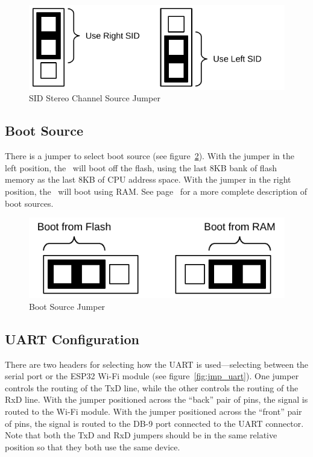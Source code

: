 \begin{figure}[ht]
    \begin{center}
        \includegraphics[scale=0.65]{images/jumper_channel.pdf}
    \end{center}
    \caption{SID Stereo Channel Source Jumper}
    \label{fig:jmp_sid_channel}
\end{figure}

\subsection*{Boot Source}

There is a jumper to select boot source (see figure~\ref{fig:jmp_boot}). With the jumper in the left position, the \fjr\ will boot off the flash, using the last 8KB bank of flash memory as the last 8KB of CPU address space. With the jumper in the right position, the \fjr\ will boot using RAM. See page~\pageref{pg:mmu_boot_config} for a more complete description of boot sources.

\begin{figure}[ht]
    \begin{center}
        \includegraphics[scale=0.65]{images/jumper_boot.pdf}
    \end{center}
    \caption{Boot Source Jumper}
    \label{fig:jmp_boot}
\end{figure}

\subsection*{UART Configuration}

There are two headers for selecting how the UART is used---selecting between the serial port or the ESP32 Wi-Fi module (see figure~\ref{fig:jmp_uart}). One jumper controls the routing of the TxD line, while the other controls the routing of the RxD line. With the jumper positioned across the ``back'' pair of pins, the signal is routed to the Wi-Fi module. With the jumper positioned across the ``front'' pair of pins, the signal is routed to the DB-9 port connected to the UART connector. Note that both the TxD and RxD jumpers should be in the same relative position so that they both use the same device.

